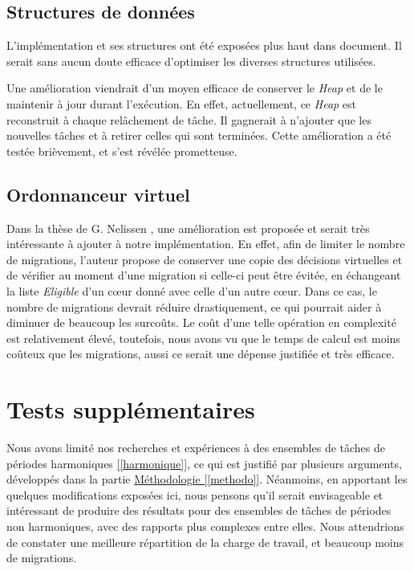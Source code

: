 	\subsection{Structures de données}
		L'implémentation et ses structures ont été exposées plus haut dans document. 
		Il serait sans aucun doute efficace d'optimiser les diverses structures utilisées. \newline
		
		Une amélioration viendrait d'un moyen efficace de conserver le \textit{Heap} et de le maintenir 
		à jour durant l'exécution. En effet, actuellement, ce \textit{Heap} est reconstruit à chaque 
		relâchement de tâche. Il gagnerait à n'ajouter que les nouvelles tâches et à retirer celles qui sont terminées.
		Cette amélioration a été testée brièvement, et s'est révélée prometteuse.

	\subsection{Ordonnanceur virtuel}
	
		Dans la thèse de G. Nelissen \cite{nelissen_geoffrey_efficient_2013}, une amélioration est proposée et serait très intéressante 
		à ajouter à notre implémentation. En effet, afin de limiter le nombre de migrations, l'auteur propose de conserver une 
		copie des décisions \og{}virtuelles\fg{} et de vérifier au moment d'une migration si celle-ci peut être évitée, en 
		échangeant la liste \textit{Eligible} d'un cœur donné avec celle d'un autre cœur. Dans ce cas, le nombre de migrations devrait 
		réduire drastiquement, ce qui pourrait aider à diminuer de beaucoup les surcoûts.
		Le coût d'une telle opération en complexité est relativement élevé, toutefois, nous avons vu que le temps de calcul 
		est moins coûteux que les migrations, aussi ce serait une dépense justifiée et très efficace.

\section{Tests supplémentaires}

	Nous avons limité nos recherches et expériences à des ensembles de tâches de périodes harmoniques \hyperref[harmonique]{[\ref{harmonique}]}, 
	ce qui est justifié par plusieurs arguments, développés dans la partie \hyperref[methodo]{Méthodologie [\ref*{methodo}]}.
	Néanmoins, en apportant les quelques modifications exposées ici, nous pensons qu'il serait envisageable et intéressant 
	de produire des résultats pour des ensembles de tâches 
	de périodes non harmoniques, avec des rapports plus complexes entre elles. Nous attendrions de constater 
	une meilleure répartition de la charge de travail, et beaucoup moins de migrations.

